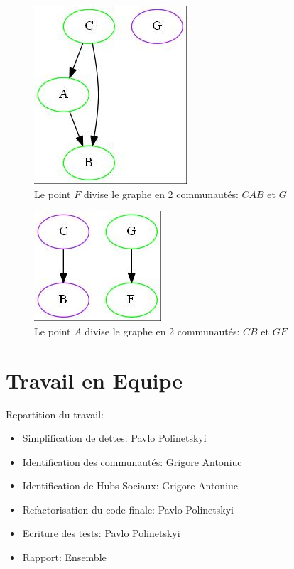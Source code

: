 \documentclass[12pt, oneside]{article}
\begin{document}
\begin{figure}[!h]
    \centering
    \includegraphics[scale=0.7,trim=3 3 3 3,clip]{APResult3_1}
    \caption{Le point $F$ divise le graphe en 2 communautés: {$CAB$} et {$G$} }
\end{figure}

\begin{figure}[!h]
    \centering
    \includegraphics[scale=0.7,trim=3 3 3 3,clip]{APResult2_2}
    \caption{Le point $A$ divise le graphe en 2 communautés: {$CB$} et {$GF$} }
\end{figure}
\newpage
\FloatBarrier
\section{Travail en Equipe}
Repartition du travail:
\begin{itemize}
\item Simplification de dettes: Pavlo Polinetskyi
\item Identification des communautés: Grigore Antoniuc
\item Identification de Hubs Sociaux: Grigore Antoniuc
\item Refactorisation du code finale: Pavlo Polinetskyi
\item Ecriture des tests: Pavlo Polinetskyi
\item Rapport: Ensemble
\end{itemize}
\bigskip
\end{document}
